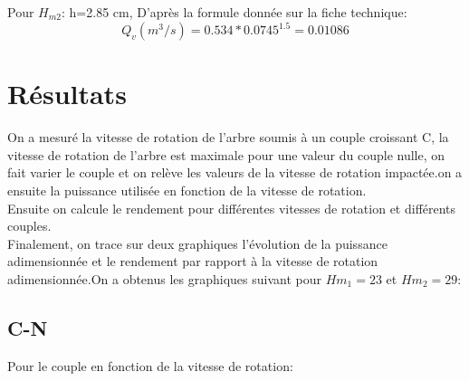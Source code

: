 \documentclass[a4paper,10pt]{report} %
\begin{document}
Pour $H_{m2}$: h=2.85 cm,
D'après la formule donnée sur la fiche technique:\\
$$Q_{v}(m^{3}/s)=0.534*0.0745^{1.5}=0.01086$$



\chapter{Résultats} 
On a  mesuré la vitesse de rotation de l'arbre soumis à un couple croissant C, la vitesse de rotation de l'arbre est maximale pour une valeur du couple nulle, on fait varier le couple et on relève les valeurs de la vitesse de rotation impactée.on a ensuite la puissance utilisée en fonction de la vitesse de rotation.\\

Ensuite on calcule le rendement pour différentes vitesses de rotation et différents couples.\\

Finalement, on trace sur deux graphiques l'évolution de la puissance adimensionnée et le rendement par rapport à la vitesse de rotation adimensionnée.On a  obtenus les graphiques suivant pour $Hm_1=23$ et $Hm_2=29$:\\






\section{C-N}

Pour le couple en fonction de la vitesse de rotation:\\
\end{document}
